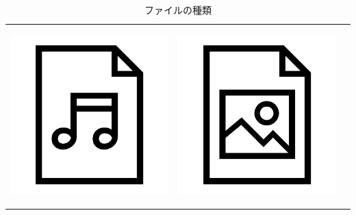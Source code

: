 \begin{table}[H]
  \begin{center}
    \caption[tab:files]{ファイルの種類}
    \begin{tabular}{|c|c|c|} \hline
    \begin{minipage}{0.3\hsize}
      \begin{center}
        \includegraphics[width=\linewidth]{images/chap03/text03-img001.png}
      \end{center}  
    \end{minipage} & 
    \begin{minipage}{0.3\hsize}
      \begin{center}
        \includegraphics[width=\linewidth]{images/chap03/text03-img002.png}

\end{center}
\end{minipage}
\end{tabular}
\end{center}
\end{table}
